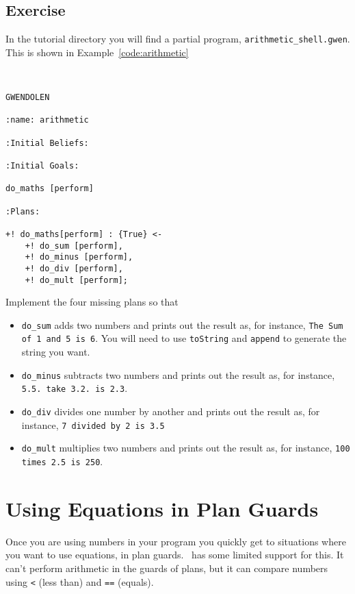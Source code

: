 \subsection{Exercise}
In the tutorial directory you will find a partial program, \texttt{arithmetic\_shell.gwen}.  This is shown in Example~\ref{code:arithmetic}

\begin{ourexample}
\label{code:arithmetic} \quad \\
\begin{lstlisting}[basicstyle=\sffamily,style=easslisting,language=Gwendolen]
GWENDOLEN

:name: arithmetic

:Initial Beliefs:

:Initial Goals:

do_maths [perform]

:Plans:
	
+! do_maths[perform] : {True} <-
	+! do_sum [perform],
	+! do_minus [perform],
	+! do_div [perform],
	+! do_mult [perform];
\end{lstlisting}
\end{ourexample}

Implement the four missing plans so that
\begin{itemize}
\item \lstinline{do_sum} adds two numbers and prints out the result as, for instance, \texttt{The Sum of 1 and 5 is 6}.  You will need to use \texttt{toString} and \texttt{append} to generate the string you want.
\item \lstinline{do_minus} subtracts two numbers and prints out the result as, for instance, \texttt{5.5. take 3.2. is 2.3}.
\item \lstinline{do_div} divides one number by another and prints out the result as, for instance, \texttt{7 divided by 2 is 3.5}
\item \lstinline{do_mult} multiplies two numbers and prints out the result as, for instance, \texttt{100 times 2.5 is 250}.
\end{itemize}

\section{Using Equations in Plan Guards}
Once you are using numbers in your program you quickly get to situations where you want to use equations, in plan guards.  \gwendolen\ has some limited support for this.  It can't perform arithmetic in the guards of plans, but it can compare numbers using \texttt{<} (less than) and \texttt{==} (equals).

